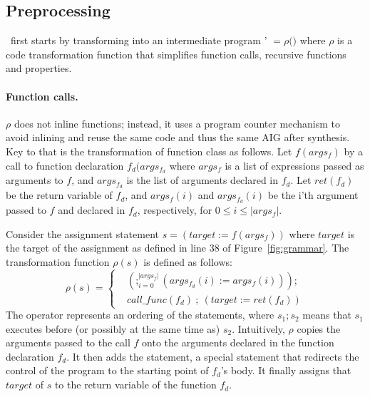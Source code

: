 \subsection{Preprocessing} \label{chap:c2aig:subsec:preproc}
\mytool~first starts by transforming 
\Pm into an intermediate program \Pm' $= \rho ($\Pm$)$ where
$\rho$ is a code transformation function that simplifies function calls, 
recursive functions and properties. 
%
\paragraph{Function calls.} 
$\rho$ does not inline functions; instead, it uses a program counter mechanism to
avoid inlining and reuse the same code and thus the same AIG after synthesis. 
Key to that is the transformation of function class as follows. 
Let $f(args_f)$ by a call to function declaration $f_d(args_{f_d}$ where $args_f$ is a list 
of expressions passed as arguments to $f$, and $args_{f_d}$ is the list of 
arguments declared in $f_d$. Let $ret(f_d)$ be the return variable of $f_d$, 
and $args_f(i)$ and $args_{f_d}(i)$ be the i'th 
argument passed to $f$ and declared in $f_d$, respectively, for $0 \leq i \leq |args_f|$.

Consider the assignment statement $s = (target := f(args_f))$ where $target$ is the 
target of the assignment as defined in line 38 of Figure~\ref{fig:grammar}.
The transformation function $\rho(s)$ is defined as follows:
\begin{equation}
\rho(s) = 
\begin{cases}
 & \left(  ;_{i = 0}^{|args_f|} \left( args_{f_d}(i) := args_f(i) \right) \right) ; \\
 & call\_func(f_d) ~;~\left( target := ret(f_d) \right) 
\end{cases}
\end{equation}
The \cci{;} operator represents an ordering of the statements, where $s_1;s_2$
means that $s_1$ executes before (or possibly at the same time as) $s_2$. 
Intuitively, $\rho$ copies the arguments passed to the call $f$ onto
the arguments declared in the function declaration $f_d$. It then 
adds the  statement, a special statement
that redirects the control of the program to the starting point of $f_d$'s body. 
It finally assigns that $target$ of $s$ to the return variable of the function $f_d$. 


